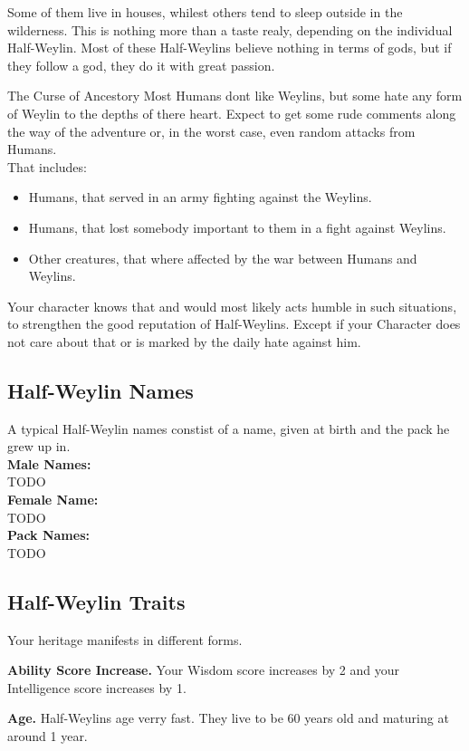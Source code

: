 Some of them live in houses, whilest others tend to sleep outside in the wilderness. This is nothing more than a taste realy, depending on the individual Half-Weylin. Most of these Half-Weylins believe nothing in terms of gods, but if they follow a god, they do it with great passion.

\begin{paperbox}{The Curse of Ancestory}
Most Humans dont like Weylins, but some hate any form of Weylin to the depths of there heart. Expect to get some rude comments along the way of the adventure or, in the worst case, even random attacks from Humans.\\
That includes: 
\begin{itemize}
\item Humans, that served in an army fighting against the Weylins.
\item Humans, that lost somebody important to them in a fight against Weylins.
\item Other creatures, that where affected by the war between Humans and Weylins.
\end{itemize}
Your character knows that and would most likely acts humble in such situations, to strengthen the good reputation of Half-Weylins. Except if your Character does not care about that or is marked by the daily hate against him.
\end{paperbox}
\subsection{Half-Weylin Names}
A typical Half-Weylin names constist of a name, given at birth and the pack he grew up in.\\

\textbf{Male Names:}\\
TODO\\
\textbf{Female Name:}\\
TODO\\
\textbf{Pack Names:}\\
TODO\\

\subsection{Half-Weylin Traits}
Your heritage manifests in different forms.

\textbf{Ability Score Increase.} Your Wisdom score increases by 2 and your Intelligence score increases by 1.

\textbf{Age.} Half-Weylins age verry fast. They live to be 60 years old and maturing at around 1 year.

